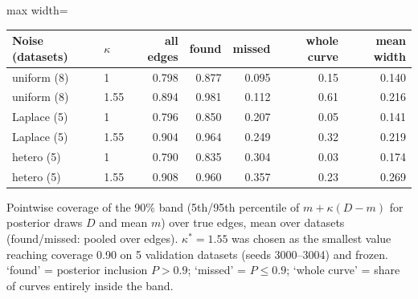 \begin{adjustbox}{max width=\textwidth}
\begin{tabular}{llrrrrr}
\toprule
Noise (datasets) & $\kappa$ & all edges & found & missed & whole curve & mean width \\
\midrule
uniform (8) & 1 & 0.798 & 0.877 & 0.095 & 0.15 & 0.140 \\
uniform (8) & 1.55 & 0.894 & 0.981 & 0.112 & 0.61 & 0.216 \\
Laplace (5) & 1 & 0.796 & 0.850 & 0.207 & 0.05 & 0.141 \\
Laplace (5) & 1.55 & 0.904 & 0.964 & 0.249 & 0.32 & 0.219 \\
hetero (5) & 1 & 0.790 & 0.835 & 0.304 & 0.03 & 0.174 \\
hetero (5) & 1.55 & 0.908 & 0.960 & 0.357 & 0.23 & 0.269 \\
\bottomrule
\end{tabular}
\end{adjustbox}

\smallskip
{\footnotesize Pointwise coverage of the 90\% band (5th/95th percentile of $m+\kappa(D-m)$ for posterior draws $D$ and mean $m$) over true edges, mean over datasets (found/missed: pooled over edges). $\kappa^*=1.55$ was chosen as the smallest value reaching coverage 0.90 on 5 validation datasets (seeds 3000--3004) and frozen. `found' = posterior inclusion $P>0.9$; `missed' = $P\le0.9$; `whole curve' = share of curves entirely inside the band.}
